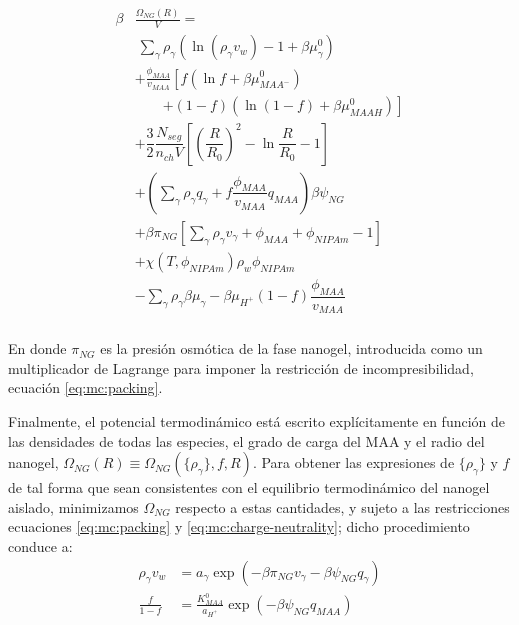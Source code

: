 	
	\begin{align}
		\begin{aligned}
			\beta&\frac{\Omega_{NG}(R)}{V}=\\& ~ \sum_{\gamma} \rho_\gamma\left(\ln\left(\rho_\gamma v_w\right) -1 + \beta\mu^0_\gamma\right) \\
			& + \frac{\phi_{MAA}}{v_{MAA}} \left[f(\ln f+ \beta\mu^0_{MAA^-})\right.\\
			&\qquad\left.+(1-f)(\ln (1-f)+\beta\mu^0_{MAAH})\right] \\
			& + \dfrac{3}{2}\dfrac{N_{seg}}{n_{ch} V}\left[\left(\dfrac{R}{R_0}\right)^2 - \ln\dfrac{R}{R_0} -1\right] \\
			& +  \left(\sum_{\gamma } {\rho_\gamma q_\gamma + f\dfrac{\phi_{MAA}}{v_{MAA}}q_{MAA}}\right)\beta\psi_{NG}\\
			& +\beta\pi_{NG} \left[ \sum_{\gamma } \rho_\gamma v_\gamma  + \phi_{MAA} + \phi_{NIPAm} -1 \right] \\
			& + \chi (T, \phi_{NIPAm})\rho_w \phi_{NIPAm} \\
			& -\sum_{\gamma }{\rho_\gamma\beta\mu_\gamma}
			-\beta\mu_{H^+}(1-f)\dfrac{\phi_{MAA}}{v_{MAA}}\\
		\end{aligned}
		\label{eq:mc:free-energy}
	\end{align}
	
	
	
	
	\noindent En donde $\pi_{NG}$ es la presi\'on osm\'otica de la fase nanogel, introducida como un multiplicador de Lagrange para imponer la restricci\'on de incompresibilidad, ecuaci\'on \ref{eq:mc:packing}.
	
	
	Finalmente, el potencial termodin\'amico est\'a escrito expl\'icitamente en funci\'on de las densidades de todas las especies, el grado de carga del MAA y el radio del nanogel, $\Omega_{NG}(R)\equiv\Omega_{NG}(\{\rho_\gamma\},f,R)$.
	Para obtener las expresiones de $\{\rho_\gamma\}$ y $f$ de tal forma que sean consistentes con el equilibrio termodin\'amico del nanogel aislado, minimizamos $\Omega_{NG}$ respecto a estas cantidades, y  sujeto a las restricciones ecuaciones  \ref{eq:mc:packing} y  \ref{eq:mc:charge-neutrality}; dicho procedimiento conduce a: 
	\begin{align}
		\rho_\gamma v_w &= a_\gamma \exp(-\beta\pi_{NG}v_\gamma -\beta\psi_{NG}q_{\gamma})\\
		\frac{f}{1-f}&= \frac{K^0_{MAA}}{a_{H^+}}\exp(-\beta\psi_{NG}q_{MAA})\label{eq:mc:fcharge}
	\end{align}
	
